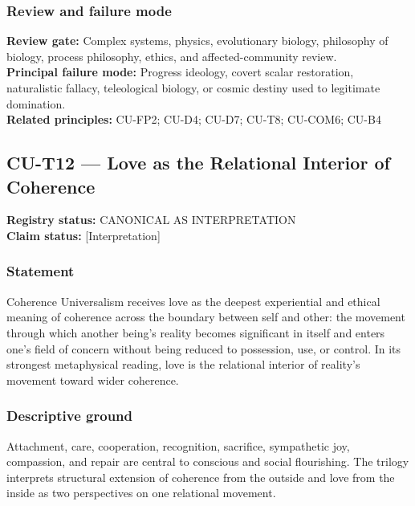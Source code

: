 \documentclass[
  11pt,
]{article}
\begin{document}
\subsubsection{Review and failure mode}\label{review-and-failure-mode-2}

\textbf{Review gate:} Complex systems, physics, evolutionary biology,
philosophy of biology, process philosophy, ethics, and
affected-community review.\\
\textbf{Principal failure mode:} Progress ideology, covert scalar
restoration, naturalistic fallacy, teleological biology, or cosmic
destiny used to legitimate domination.\\
\textbf{Related principles:} CU-FP2; CU-D4; CU-D7; CU-T8; CU-COM6; CU-B4

\subsection{CU-T12 --- Love as the Relational Interior of
Coherence}\label{cu-t12-love-as-the-relational-interior-of-coherence}

\textbf{Registry status:} CANONICAL AS INTERPRETATION\\
\textbf{Claim status:} {[}Interpretation{]}

\subsubsection{Statement}\label{statement-61}

Coherence Universalism receives love as the deepest experiential and
ethical meaning of coherence across the boundary between self and other:
the movement through which another being's reality becomes significant
in itself and enters one's field of concern without being reduced to
possession, use, or control. In its strongest metaphysical reading, love
is the relational interior of reality's movement toward wider coherence.

\subsubsection{Descriptive ground}\label{descriptive-ground-3}

Attachment, care, cooperation, recognition, sacrifice, sympathetic joy,
compassion, and repair are central to conscious and social flourishing.
The trilogy interprets structural extension of coherence from the
outside and love from the inside as two perspectives on one relational
movement.
\end{document}
